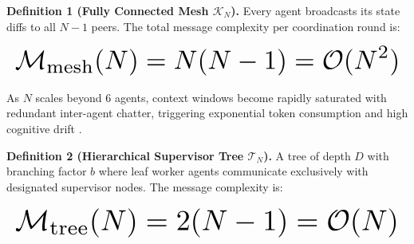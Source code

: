 \documentclass[10pt,journal,compsoc,twocolumn]{IEEEtran}
\begin{document}
\textbf{Definition 1 (Fully Connected Mesh $\mathcal{K}_N$).} Every agent broadcasts its state diffs to all $N-1$ peers. The total message complexity per coordination round is:



















\begin{equation}
\resizebox{\columnwidth}{!}{$\displaystyle
\begin{aligned}
\mathcal{M}_{\text{mesh}}(N) = N(N - 1) = \mathcal{O}(N^2)
\end{aligned}
$}
\end{equation}



















As $N$ scales beyond 6 agents, context windows become rapidly saturated with redundant inter-agent chatter, triggering exponential token consumption and high cognitive drift \cite{arxiv_2412_06333}.

\textbf{Definition 2 (Hierarchical Supervisor Tree $\mathcal{T}_N$).} A tree of depth $D$ with branching factor $b$ where leaf worker agents communicate exclusively with designated supervisor nodes. The message complexity is:



















\begin{equation}
\resizebox{\columnwidth}{!}{$\displaystyle
\begin{aligned}
\mathcal{M}_{\text{tree}}(N) = 2(N - 1) = \mathcal{O}(N)
\end{aligned}
$}
\end{equation}
\end{document}
